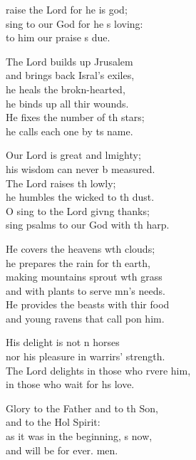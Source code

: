 \begin{psalmverse}
  \begin{patverse}
raise the Lord for he is god;\Flex\\
sing to our God for he \pointup{\i}s loving:\Med\\
to him our praise \pointup{\i}s due.

The Lord builds up Jrusalem\Med\\
and brings back Isral’s exiles,\\
he heals the brokn-hearted,\Med\\
he binds up all thir wounds.\\
He fixes the number of th stars;\Med\\
he calls each one by \pointup{\i}ts name.

Our Lord is great and lmighty;\Med\\
his wisdom can never b measured.\\
The Lord raises th lowly;\Med\\
he humbles the wicked to th dust.\\
O sing to the Lord giv\pointup{\i}ng thanks;\Med\\
sing psalms to our God with th harp.

He covers the heavens w\pointup{\i}th clouds;\Med\\
he prepares the rain for th earth,\\
making mountains sprout w\pointup{\i}th grass\Med\\
and with plants to serve mn’s needs.\\
He provides the beasts with thir food\Med\\
and young ravens that call pon him.

His delight is not \pointup{\i}n horses\Med\\
nor his pleasure in warrirs’ strength.\\
The Lord delights in those who rvere him,\Med\\
in those who wait for h\pointup{\i}s love.

Glory to the Father and to th Son,\Med\\
and to the Hol Spirit:\\
as it was in the beginning, \pointup{\i}s now,\Med\\
and will be for ever. men.
  \end{patverse}
  \end{psalmverse}
